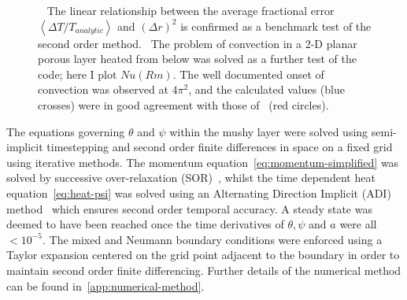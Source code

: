 \documentclass[11pt]{proc}
\begin{document}
\begin{figure}[t!]
\captionsetup[subfigure]{position=top,singlelinecheck=off,justification=raggedright, aboveskip=-12pt,belowskip=0pt}
\begin{subfigure}[t]{.48\linewidth}
	\centering
	\caption{}
	\newlength\figureheight 
	\newlength\figurewidth 
	\setlength\figureheight{4cm} 
	\setlength\figurewidth{6cm}
	
	\label{subfig:heated-wire-error}
\end{subfigure}
\quad
\captionsetup[subfigure]{aboveskip=-6pt}
\begin{subfigure}[t]{.48\linewidth}
	\centering
	\caption{} 
	\setlength\figureheight{4cm} 
	\setlength\figurewidth{6cm}
	
	\label{subfig:HRL-Nu-comparison}
\end{subfigure}

\setlength{\belowcaptionskip}{-7pt} %

\caption{~ The linear relationship between the average fractional error $\left<\Delta T/T_{analytic} \right>$ and $(\Delta r)^2$ is confirmed as a benchmark test of the second order method.~ The problem of convection in a 2-D planar porous layer heated from below was solved as a further test of the code; here I plot $Nu(Rm)$. The well documented onset of convection was observed at $4 \pi^2$, and the calculated values (blue crosses) were in good agreement with those of~\citet*{caltagirone-75} (red circles).}
\label{fig:code-verification}
\end{figure}

The equations governing $\theta$ and $\psi$ within the mushy layer were solved using semi-implicit timestepping and second order finite differences in space on a fixed grid using iterative methods. The momentum equation~\eqref{eq:momentum-simplified} was solved by successive over-relaxation (SOR)~\citep*{young-50}, whilst the time dependent heat equation~\eqref{eq:heat-psi} was solved using an Alternating Direction Implicit (ADI) method~\citep*{peaceman-rachford-55} which ensures second order temporal accuracy. A steady state was deemed to have been reached once the time derivatives of $\theta, \psi$ and $a$ were all $< 10^{-5}$. The mixed and Neumann boundary conditions were enforced using a Taylor expansion centered on the grid point adjacent to the boundary in order to maintain second order finite differencing. Further details of the numerical method can be found in~\autoref{app:numerical-method}.
\end{document}
